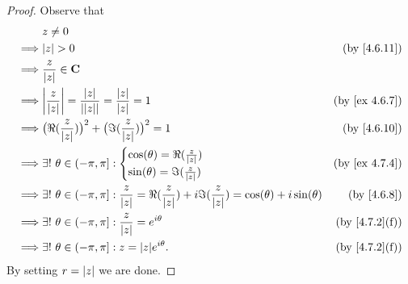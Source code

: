 \begin{proof}
  Observe that
  \begin{align*}
             & z \neq 0                                                                                                                                                               \\
    \implies & \abs{z} > 0                                                                                                                              & \text{(by \cref{4.6.11})}   \\
    \implies & \frac{z}{\abs{z}} \in \C                                                                                                                                               \\
    \implies & \abs{\frac{z}{\abs{z}}} = \frac{\abs{z}}{\abs{\abs{z}}} = \frac{\abs{z}}{\abs{z}} = 1                                                    & \text{(by \cref{ex 4.6.7})} \\
    \implies & \big(\Re(\frac{z}{\abs{z}})\big)^2 + \big(\Im(\frac{z}{\abs{z}})\big)^2 = 1                                                              & \text{(by \cref{4.6.10})}   \\
    \implies & \exists!\ \theta \in (-\pi, \pi] : \begin{cases}
                                                    \cos(\theta) = \Re(\frac{z}{\abs{z}}) \\
                                                    \sin(\theta) = \Im(\frac{z}{\abs{z}})
                                                  \end{cases}                                                                  & \text{(by \cref{ex 4.7.4})}                          \\
    \implies & \exists!\ \theta \in (-\pi, \pi] : \frac{z}{\abs{z}} = \Re(\frac{z}{\abs{z}}) + i \Im(\frac{z}{\abs{z}}) = \cos(\theta) + i \sin(\theta) & \text{(by \cref{4.6.8})}    \\
    \implies & \exists!\ \theta \in (-\pi, \pi] : \frac{z}{\abs{z}} = e^{i \theta}                                                                      & \text{(by \cref{4.7.2}(f))} \\
    \implies & \exists!\ \theta \in (-\pi, \pi] : z = \abs{z} e^{i \theta}.                                                                             & \text{(by \cref{4.7.2}(f))}
  \end{align*}
  By setting \(r = \left\lvert z\right\rvert\) we are done.
\end{proof}


